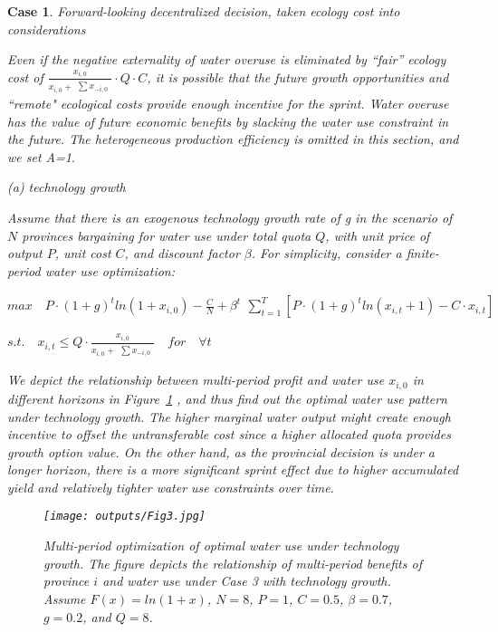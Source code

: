 \documentclass[default, sn-standardnature]{sn-jnl}
\newtheorem{case_appendix}{Case}
\begin{document}
    \begin{case_appendix}Forward-looking decentralized decision, taken ecology cost into considerations

    Even if the negative externality of water overuse is eliminated by ``fair'' ecology cost of $\frac{x_{i,0}}{x_{i,0} + \begin{matrix} \sum x_{-i,0} \end{matrix}} \cdot Q \cdot C$, it is possible that the future growth opportunities and ``remote" ecological costs provide enough incentive for the sprint.  Water overuse has the value of future economic benefits by slacking the water use constraint in the future. The heterogeneous production efficiency is omitted in this section, and we set A=1.

(a) technology growth

Assume that there is an exogenous technology growth rate of g in the scenario of $N$ provinces bargaining for water use under total quota $Q$, with unit price of output $P$, unit cost $C$, and discount factor $\beta$. For simplicity, consider a finite-period water use optimization:

$ max \quad P \cdot (1+g)^t ln(1+x_{i,0})-\frac{C}{N}+\beta^t \begin{matrix} \sum_{t=1}^T [P \cdot (1+g)^t ln(x_{i,t}+1)-C \cdot x_{i,t}] \end{matrix}$

$s.t. \quad x_{i,t} \leq Q \cdot \frac{x_{i,0}}{x_{i,0} + \begin{matrix} \sum x_{-i,0} \end{matrix}} \quad for \quad \forall t$

We depict the relationship between multi-period profit and water use $x_{i,0}$ in different horizons in Figure~\ref{fig:technology}
, and thus find out the optimal water use pattern under technology growth. The higher marginal water output might create enough incentive to offset the untransferable cost since a higher allocated quota provides growth option value. On the other hand, as the provincial decision is under a longer horizon, there is a more significant sprint effect due to higher accumulated yield and relatively tighter water use constraints over time.

\begin{figure}[H]
    \centering
    \texttt{[image: outputs/Fig3.jpg]}
    \caption{Multi-period optimization of optimal water use under technology growth. The figure depicts the relationship of multi-period benefits of province $i$ and water use under Case 3 with technology growth. Assume $F(x)=ln(1+x)$, $N=8$, $P=1$, $C=0.5$, $\beta=0.7$, $g=0.2$, and $Q=8$.}
    \label{fig:technology}
\end{figure}


\end{case_appendix}
\end{document}
